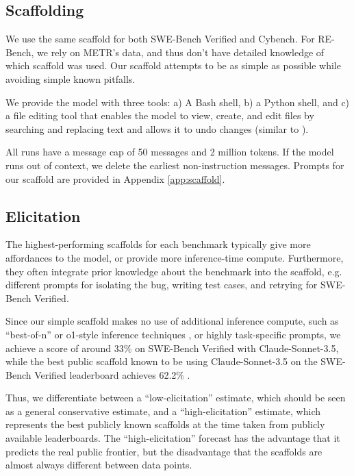 \subsection{Scaffolding}
We use the same scaffold for both SWE-Bench Verified and Cybench. For RE-Bench, we rely on METR's data, and thus don't have detailed knowledge of which scaffold was used.
Our scaffold attempts to be as simple as possible while avoiding simple known pitfalls.


We provide the model with three tools: a) A Bash shell, b) a Python shell, and c) a file editing tool that enables the model to view, create, and edit files by searching and replacing text and allows it to undo changes (similar to \citet{anthropic2024raisingbarswebench}).

All runs have a message cap of 50 messages and 2 million tokens. If the model runs out of context, we delete the earliest non-instruction messages.
Prompts for our scaffold are provided in Appendix \ref{app:scaffold}.

\subsection{Elicitation}
\label{subsec:elicitation}

The highest-performing scaffolds for each benchmark typically give more affordances to the model, or provide more inference-time compute. Furthermore, they often integrate prior knowledge about the benchmark into the scaffold, e.g. different prompts for isolating the bug, writing test cases, and retrying for SWE-Bench Verified.

Since our simple scaffold makes no use of additional inference compute, such as ``best-of-n'' or o1-style inference techniques \citep{openai2024learningreasonllms}, or highly task-specific prompts, we achieve a score of around 33\% on SWE-Bench Verified with Claude-Sonnet-3.5, while the best public scaffold known to be using Claude-Sonnet-3.5 on the SWE-Bench Verified leaderboard achieves 62.2\% \citep{pani2024sotaswebench}. 

Thus, we differentiate between a ``low-elicitation'' estimate, which should be seen as a general conservative estimate, and a ``high-elicitation'' estimate, which represents the best publicly known scaffolds at the time taken from publicly available leaderboards. The ``high-elicitation'' forecast has the advantage that it predicts the real public frontier, but the disadvantage that the scaffolds are almost always different between data points. 

